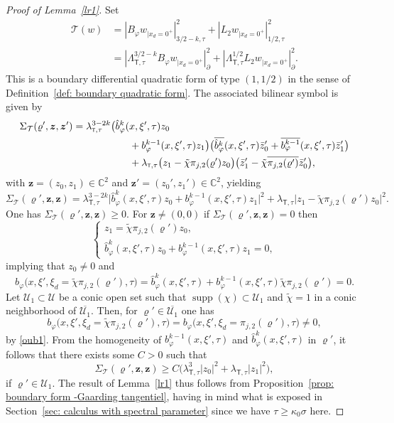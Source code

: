 \documentclass[JEP,XML,SOM,Unicode,published]{cedram}
\theoremstyle{plain}
\theoremstyle{definition}
\def\C{\mathbb{C}}
\newcommand{\nhd}{neighborhood\xspace}
\let\k\kappa
\let\y\varrho
\newcommand{\tchi}{\tilde{\chi}}
\newcommand{\ovl}[1]{\overline{#1}}
\newcommand{\un}[1]{\Sigma_{#1}}
\newcommand{\U}{\mathscr U}
\newcommand{\z}{\boldsymbol{z}}
\newcommand{\br}{\ensuremath{_{|x_d=0^+}}}
\newcommand{\norm}[2]{{|#1|}_{#2}}
\newcommand{\normsc}[2]{{| #1 |}_{#2, \tau}}
\newcommand{\lsct}{\lambda_{{\scriptscriptstyle{\mathsf T}},\tau}}
\newcommand{\Lsct}{\Lambda_{{\scriptscriptstyle{\mathsf T}},\tau}}
\DeclareMathOperator{\supp}{supp}
\begin{document}
\begin{proof}[Proof of Lemma~\ref{lr1}]
Set
\begin{align*}
\mathcal T(w) &= \normsc{B_\varphi w\br}{3/2-k}^2
+ \normsc{L_2 w\br}{1/2}^2\\
&=\norm{\Lsct^{3/2-k} B_\varphi w\br}{\partial}^2
+ \norm{\Lsct^{1/2} L_2 w\br}{\partial}^2.
\end{align*}
This is a boundary differential quadratic form of type $(1,1/2)$ in
the sense of Definition~\ref{def: boundary quadratic form}.
The associated bilinear symbol is given by
\begin{align*}
\un{\mathcal T}(\y',\z,\z')
&= \lsct^{3-2k} \big (\hat{b}^k_{\varphi}(x,\xi',\tau) z_0 \\
&\hspace*{2cm} +
b^{k-1}_{\varphi}(x,\xi',\tau) z_1\big)
\big(\ovl{\hat{b}^k_{\varphi}}(x,\xi',\tau) \bar{z}_0'+
\ovl{ b^{k-1}_{\varphi}}(x,\xi',\tau) \bar{z}_1'\big)\\
&\hspace*{2cm} + \lsct \big(z_1 - \tchi \pi_{j,2}(\y') z_0 \big)
\big(\bar{z}_1' - \tchi \ovl{\pi_{j,2}(\y')}\bar{z}_0'\big),
\end{align*}
with $\z = (z_0, z_1) \in \C^2$ and $\z' = (z_0', z_1') \in \C^2$,
yielding
\[
\un{\mathcal T}(\y',\z,\z)
= \lsct^{3-2k} \big |\hat{b}^k_{\varphi}(x,\xi',\tau) z_0 +
b^{k-1}_{\varphi}(x,\xi',\tau) z_1\big|^2 
 + \lsct \big|z_1 - \tchi \pi_{j,2}(\y') z_0 \big|^2.
\]
One has $\un{\mathcal T}(\y',\z,\z)\geq 0$.
For $\z\neq (0,0)$ if $\un{\mathcal T}(\y',\z,\z)=0$ then
\begin{equation*}
\begin{cases}
z_1 = \tchi \pi_{j,2}(\y') z_0,\\
\hat{b}^k_{\varphi}(x,\xi',\tau) z_0 +
b^{k-1}_{\varphi}(x,\xi',\tau) z_1=0,
\end{cases}
\end{equation*}
implying that $z_0 \neq 0$ and
\begin{equation*}
b_\varphi \big(x,\xi', \xi_d= \tchi \pi_{j,2}(\y'), \tau \big)
= \hat{b}^k_{\varphi}(x,\xi',\tau) +
b^{k-1}_{\varphi}(x,\xi',\tau) \tchi \pi_{j,2}(\y') =0.
\end{equation*}
Let $\U_1 \subset \U$ be a conic open set such that $\supp(\chi)
\subset \U_1$ and $\tchi=1$ in a conic \nhd of
$\ovl{\U_1}$. Then, for $\y' \in \ovl{\U_1}$ one has
\begin{equation*}
b_\varphi \big(x,\xi', \xi_d= \tchi \pi_{j,2}(\y'), \tau \big)
= b_\varphi \big(x,\xi', \xi_d= \pi_{j,2}(\y'), \tau \big) \neq 0,
\end{equation*}
by \eqref{oub1}. From the homogeneity of
$b^{k-1}_{\varphi}(x,\xi',\tau)$ and
$\hat{b}^k_{\varphi}(x,\xi',\tau)$ in $\y'$,
it follows that there exists some $C>0$ such that
\begin{equation*}
\un{\mathcal T}(\y',\z,\z) \geq C \big(\lsct^3 |z_0|^2 + \lsct |z_1|^2 \big),
\end{equation*}
if $\y' \in \U_1$.
The result of Lemma~\ref{lr1} thus follows from Proposition~\ref{prop:
boundary form -Gaarding tangentiel}, having in mind what is exposed in
Section~\ref{sec: calculus with spectral parameter} since we have $\tau \geq \k_0 \sigma$ here.
\end{proof}
\end{document}
